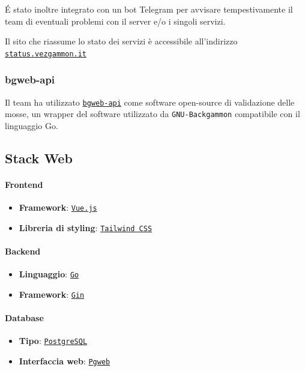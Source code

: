 \documentclass{article}
\begin{document}
\'E stato inoltre integrato con un bot Telegram per avvisare tempestivamente il team di eventuali problemi con il server 
e/o i singoli servizi.

Il sito che riassume lo stato dei servizi è accessibile all'indirizzo \href{https://status.vezgammon.it}{\texttt{status.vezgammon.it}}

\subsubsection{bgweb-api}
Il team ha utilizzato \href{https://github.com/foochu/bgweb-api}{\texttt{bgweb-api}} come software open-source di validazione delle mosse, 
un wrapper del software utilizzato da \texttt{GNU-Backgammon} compatibile con il linguaggio Go.

\subsection{Stack Web}

\paragraph{Frontend}
\begin{itemize}
    \item \textbf{Framework}: \href{https://github.com/vuejs/core/}{\texttt{Vue.js}}
    \item \textbf{Libreria di styling}: \href{https://github.com/tailwindlabs/tailwindcss}{\texttt{Tailwind CSS}}
\end{itemize}

\paragraph{Backend}
\begin{itemize}
    \item \textbf{Linguaggio}: \href{https://github.com/golang/go}{\texttt{Go}}
    \item \textbf{Framework}: \href{https://github.com/gin-gonic/gin}{\texttt{Gin}}
\end{itemize}

\paragraph{Database}
\begin{itemize}
    \item \textbf{Tipo}: \href{https://github.com/postgres/postgres}{\texttt{PostgreSQL}}
    \item \textbf{Interfaccia web}: \href{https://github.com/sosedoff/pgweb}{\texttt{Pgweb}}
\end{itemize}
\end{document}
